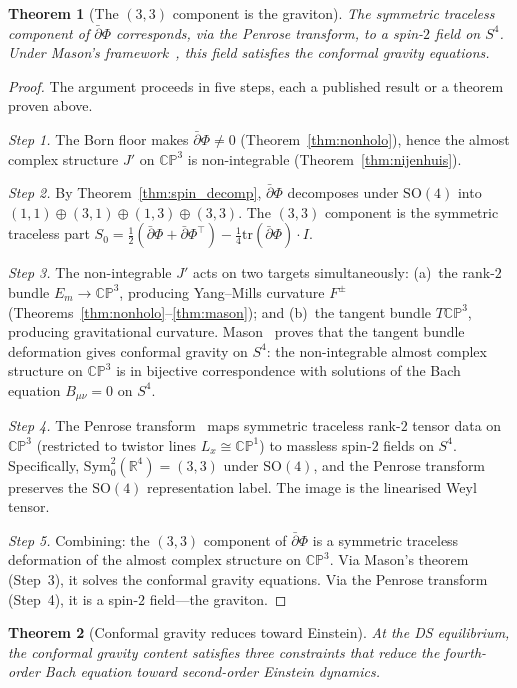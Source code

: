 \documentclass[11pt,a4paper]{article}
\newtheorem{theorem}{Theorem}[section]
\theoremstyle{definition}
\theoremstyle{remark}
\newcommand{\CP}{\mathbb{CP}}
\newcommand{\R}{\mathbb{R}}
\newcommand{\dbar}{\bar{\partial}}
\begin{document}
\begin{theorem}[The $(3,3)$ component is the graviton]\label{thm:graviton}
The symmetric traceless component of $\dbar\Phi$ corresponds, via the Penrose transform, to a spin-$2$ field on $S^4$. Under Mason's framework~\cite{Mason2005}, this field satisfies the conformal gravity equations.
\end{theorem}

\begin{proof}
The argument proceeds in five steps, each a published result or a theorem proven above.

\emph{Step 1.} The Born floor makes $\dbar\Phi\neq 0$ (Theorem~\ref{thm:nonholo}), hence the almost complex structure $J'$ on $\CP^3$ is non-integrable (Theorem~\ref{thm:nijenhuis}).

\emph{Step 2.} By Theorem~\ref{thm:spin_decomp}, $\dbar\Phi$ decomposes under $\mathrm{SO}(4)$ into $(1,1)\oplus(3,1)\oplus(1,3)\oplus(3,3)$. The $(3,3)$ component is the symmetric traceless part $S_0=\frac{1}{2}(\dbar\Phi+\dbar\Phi^\top)-\frac{1}{4}\mathrm{tr}(\dbar\Phi)\cdot I$.

\emph{Step 3.} The non-integrable $J'$ acts on two targets simultaneously: (a)~the rank-$2$ bundle $E_m\to\CP^3$, producing Yang--Mills curvature $F^\pm$ (Theorems~\ref{thm:nonholo}--\ref{thm:mason}); and (b)~the tangent bundle $T\CP^3$, producing gravitational curvature. Mason~\cite{Mason2005} proves that the tangent bundle deformation gives conformal gravity on $S^4$: the non-integrable almost complex structure on $\CP^3$ is in bijective correspondence with solutions of the Bach equation $B_{\mu\nu}=0$ on $S^4$.

\emph{Step 4.} The Penrose transform~\cite{AHS1978,LeBrunMason} maps symmetric traceless rank-$2$ tensor data on $\CP^3$ (restricted to twistor lines $L_x\cong\CP^1$) to massless spin-$2$ fields on $S^4$. Specifically, $\mathrm{Sym}^2_0(\R^4)=(3,3)$ under $\mathrm{SO}(4)$, and the Penrose transform preserves the $\mathrm{SO}(4)$ representation label. The image is the linearised Weyl tensor.

\emph{Step 5.} Combining: the $(3,3)$ component of $\dbar\Phi$ is a symmetric traceless deformation of the almost complex structure on $\CP^3$. Via Mason's theorem (Step~3), it solves the conformal gravity equations. Via the Penrose transform (Step~4), it is a spin-$2$ field---the graviton.
\end{proof}

\begin{theorem}[Conformal gravity reduces toward Einstein]\label{thm:bach_to_einstein}
At the DS equilibrium, the conformal gravity content satisfies three constraints that reduce the fourth-order Bach equation toward second-order Einstein dynamics.
\end{theorem}
\end{document}
